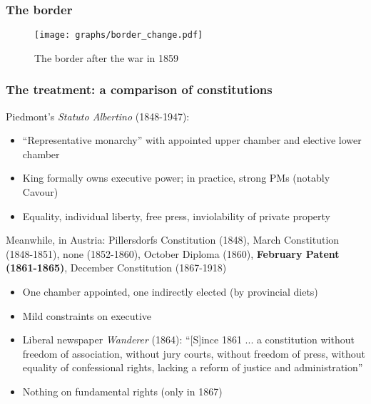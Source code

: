\documentclass[10pt]{beamer}
\begin{document}
\begin{frame}
    \frametitle{The border}


    \begin{figure}
        \centering
        \texttt{[image: graphs/border\_change.pdf]}
        \caption{The border after the war in 1859}
        \label{fig:border_change}
    \end{figure}

\end{frame}

\begin{frame}
    \frametitle{The treatment: a comparison of constitutions}
    
    Piedmont's \textit{Statuto Albertino} (1848-1947):
    \begin{itemize}
        \item ``Representative monarchy'' with appointed upper chamber and elective lower chamber 
        \item King formally owns executive power; in practice, strong PMs (notably Cavour)
        \item Equality, individual liberty, free press, inviolability of private property
    \end{itemize}

    \pause
    \bigskip
    
    Meanwhile, in Austria: Pillersdorfs Constitution (1848), March Constitution (1848-1851), none (1852-1860), October Diploma (1860), \textbf{February Patent (1861-1865)}, December Constitution (1867-1918)

    \begin{itemize}
        \item One chamber appointed, one indirectly elected (by provincial diets) 
        \item Mild constraints on executive %
        \item Liberal newspaper \textit{Wanderer} (1864): ``[S]ince 1861 ... a constitution without freedom of association, without jury courts, without freedom of press, without equality of confessional rights, lacking a reform of justice and administration''
        \item Nothing on fundamental rights (only in 1867)
    \end{itemize}

\end{frame}
\end{document}
